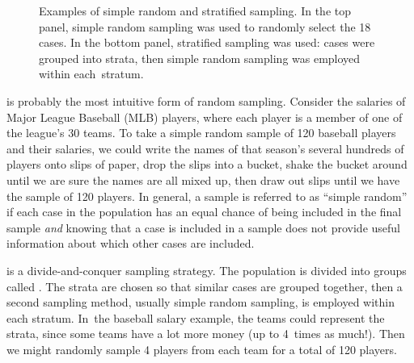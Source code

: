 \begin{figure}
  \centering
  \caption{
      Examples of simple random
      and stratified sampling.
      In the top panel, simple random sampling was used to randomly
      select the 18 cases.
      In the bottom panel, stratified sampling was used:
      cases were grouped into strata, then simple random sampling
      was employed within \mbox{each stratum}.}
  \label{simple_stratified}
\end{figure}

 is probably the most intuitive form of random sampling. Consider the salaries of Major League Baseball (MLB) players, where each player is a member of one of the league's 30 teams. To take a simple random sample of 120 baseball players and their salaries, we could write the names of that season's several hundreds of players onto slips of paper, drop the slips into a bucket, shake the bucket around until we are sure the names are all mixed up, then draw out slips until we have the sample of 120 players. In general, a sample is referred to as ``simple random'' if each case in the population has an equal chance of being included in the final sample \emph{and} knowing that a case is included in a sample does not provide useful information about which other cases are included.

is a divide-and-conquer sampling strategy.
The population is divided into groups called
.
The strata are chosen so that similar cases are grouped
together, then a second sampling method, usually simple
random sampling, is employed within each stratum.
In~the baseball salary example, the teams could represent
the strata, since some teams have a lot more money
(up to 4~times as much!).
Then we might randomly sample 4 players from each team for
a total of 120 players.

